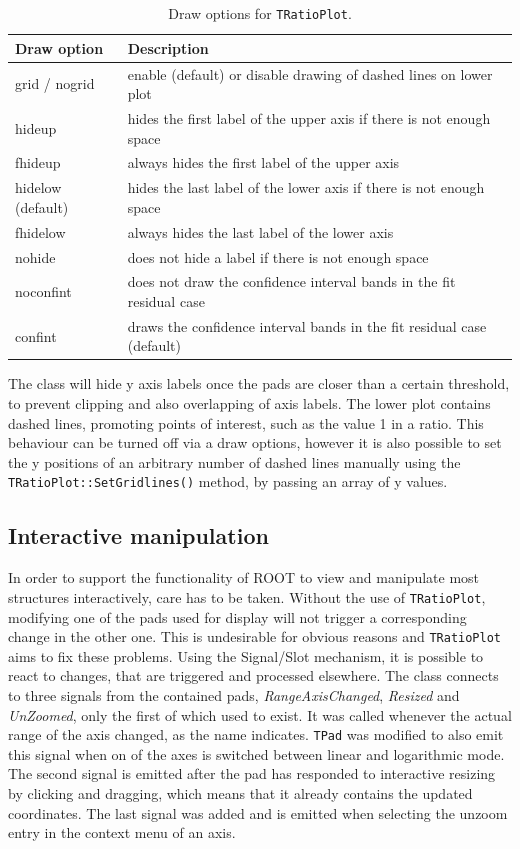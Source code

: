 \begin{table}[hb]
  \centering
  \begin{tabular}{l|l}
    Draw option & Description \\
    \hline
    grid / nogrid & enable (default) or disable drawing of dashed lines on lower plot \\
    hideup & hides the first label of the upper axis if there is not enough space \\
    fhideup & always hides the first label of the upper axis \\
    hidelow (default) & hides the last label of the lower axis if there is not enough space \\
    fhidelow & always hides the last label of the lower axis \\
    nohide & does not hide a label if there is not enough space \\
    noconfint & does not draw the confidence interval bands in the fit residual case \\
    confint & draws the confidence interval bands in the fit residual case (default) \\
  \end{tabular}  
  \caption{Draw options for \texttt{TRatioPlot}.}
  \label{tab:drawopt}
\end{table}

\noindent
The class will hide y axis labels once the pads are closer than a certain threshold, to prevent clipping
and also overlapping of axis labels. The lower plot contains dashed lines, promoting points of interest,
such as the value 1 in a ratio. This behaviour can be turned off via a draw options, however it is 
also possible to set the y positions of an arbitrary number of dashed lines manually using the
\texttt{TRatioPlot::SetGridlines()} method, by passing an array of y values.

\subsection{Interactive manipulation}

In order to support the functionality of ROOT to view and manipulate most structures interactively,
care has to be taken. Without the use of \texttt{TRatioPlot}, modifying one of the pads used for
display will not trigger a corresponding change in the other one. This is undesirable for obvious reasons and
\texttt{TRatioPlot} aims to fix these problems. Using the Signal/Slot mechanism, it is possible 
to react to changes, that are triggered and processed elsewhere. The class connects to three signals
from the contained pads, \emph{RangeAxisChanged}, \emph{Resized} and \emph{UnZoomed}, only the first
of which used to exist. It was called whenever the actual range of the axis changed, as the name
indicates. \texttt{TPad} was modified to also emit this signal when on of the axes is switched
between linear and logarithmic mode. The second signal is emitted after the pad has responded to 
interactive resizing by clicking and dragging, which means that it already contains the updated
coordinates. The last signal was added and is emitted when selecting the unzoom entry in the context
menu of an axis. 

